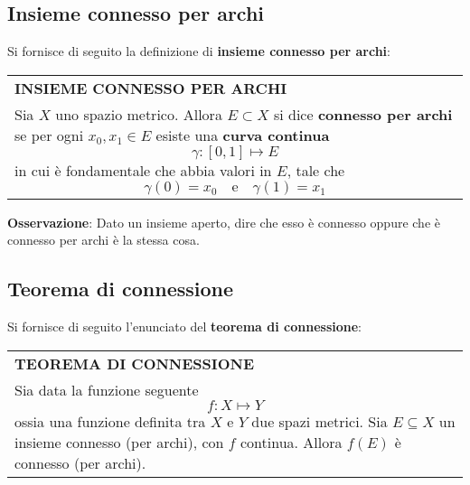 \documentclass[a4paper]{extarticle}
\renewcommand\arraystretch{}
\begin{document}
\vspace{1em}
\noindent
\subsection{Insieme connesso per archi}
Si fornisce di seguito la definizione di \textbf{insieme connesso per archi}:

\vspace{1em}
\setlength{\tabcolsep}{14pt}
\renewcommand{\arraystretch}{2}
\noindent
\begin{tabularx}{\textwidth}{@{}|P|@{}}
    \hline
    {\textbf{INSIEME CONNESSO PER ARCHI}}\\
    \parbox{\linewidth}{Sia $X$ uno spazio metrico. Allora $E \subset X$ si dice \textbf{connesso per archi} se per ogni $x_0,x_1 \in E$ esiste una \textbf{curva continua}
    \[\boxed{\gamma : [0,1] \longmapsto E}\]
    in cui è fondamentale che abbia valori in $E$, tale che
    \[\gamma(0)=x_0 \hspace{1em} \text{e} \hspace{1em} \gamma(1)=x_1\]
    \vspace{-3mm}}\\
    \hline
\end{tabularx}

\vspace{2em}
\noindent
\textbf{Osservazione}: Dato un insieme aperto, dire che esso è connesso oppure che è connesso per archi è la stessa cosa.

\newpage
\noindent
\subsection{Teorema di connessione}
Si fornisce di seguito l'enunciato del \textbf{teorema di connessione}:

\vspace{1em}
\setlength{\tabcolsep}{14pt}
\renewcommand{\arraystretch}{2}
\noindent
\begin{tabularx}{\textwidth}{@{}|P|@{}}
    \hline
    {\textbf{TEOREMA DI CONNESSIONE}}\\
    \parbox{\linewidth}{Sia data la funzione seguente
    \[f : X \longmapsto Y\]
    ossia una funzione definita tra $X$ e $Y$ due spazi metrici. Sia $E \subseteq X$ un insieme connesso (per archi), con $f$ continua. Allora $f(E)$ è connesso (per archi).
    \vspace{3mm}}\\
    \hline
\end{tabularx}
\end{document}
